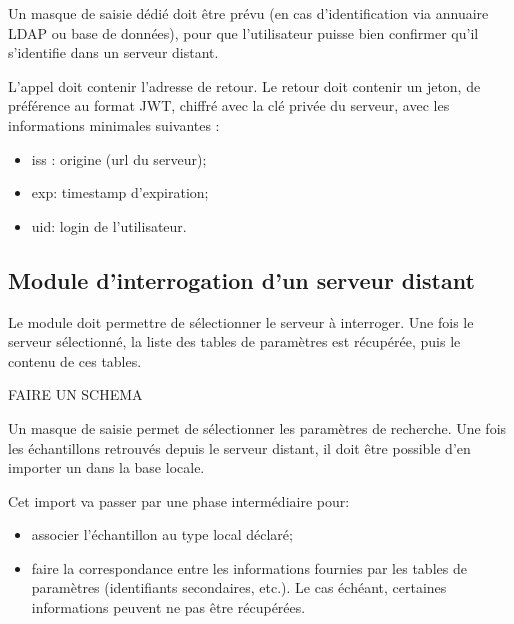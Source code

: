 Un masque de saisie dédié doit être prévu (en cas d'identification via annuaire LDAP ou base de données), pour que l'utilisateur puisse bien confirmer qu'il s'identifie dans un serveur distant.

L'appel doit contenir l'adresse de retour. Le retour doit contenir un jeton, de préférence au format JWT, chiffré avec la clé privée du serveur, avec les informations minimales suivantes :
\begin{itemize}
\item iss : origine (url du serveur);
\item exp: timestamp d'expiration;
\item uid: login de l'utilisateur.
\end{itemize}

\subsection{Module d'interrogation d'un serveur distant}
Le module doit permettre de sélectionner le serveur à interroger. Une fois le serveur sélectionné, la liste des tables de paramètres est récupérée, puis le contenu de ces tables.

FAIRE UN SCHEMA

Un masque de saisie permet de sélectionner les paramètres de recherche. Une fois les échantillons retrouvés depuis le serveur distant, il doit être possible d'en importer un dans la base locale.

Cet import va passer par une phase intermédiaire pour:
\begin{itemize}
\item associer l'échantillon au type local déclaré;
\item faire la correspondance entre les informations fournies par les tables de paramètres (identifiants secondaires, etc.). Le cas échéant, certaines informations peuvent ne pas être récupérées.
\end{itemize}

